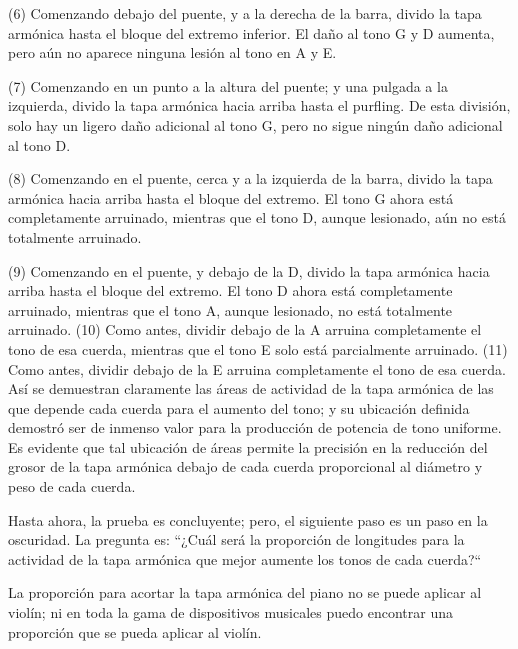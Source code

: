 \documentclass[12pt]{book}
\begin{document}
(6) Comenzando debajo del puente, y a la derecha de la barra, divido la tapa armónica hasta el bloque del extremo inferior. El daño al tono G y D aumenta, pero aún no aparece ninguna lesión al tono en A y E.

(7) Comenzando en un punto a la altura del puente; y una pulgada a la izquierda, divido la tapa armónica hacia arriba hasta el purfling. De esta división, solo hay un ligero daño adicional al tono G, pero no sigue ningún daño adicional al tono D.

(8) Comenzando en el puente, cerca y a la izquierda de la barra, divido la tapa armónica hacia arriba hasta el bloque del extremo. El tono G ahora está completamente arruinado, mientras que el tono D, aunque lesionado, aún no está totalmente arruinado.

(9) Comenzando en el puente, y debajo de la D, divido la tapa armónica hacia arriba hasta el bloque del extremo. El tono D ahora está completamente arruinado, mientras que el tono A, aunque lesionado, no está totalmente arruinado. (10) Como antes, dividir debajo de la A arruina completamente el tono de esa cuerda, mientras que el tono E solo está parcialmente arruinado. (11) Como antes, dividir debajo de la E arruina completamente el tono de esa cuerda. Así se demuestran claramente las áreas de actividad de la tapa armónica de las que depende cada cuerda para el aumento del tono; y su ubicación definida demostró ser de inmenso valor para la producción de potencia de tono uniforme. Es evidente que tal ubicación de áreas permite la precisión en la reducción del grosor de la tapa armónica debajo de cada cuerda proporcional al diámetro y peso de cada cuerda.

Hasta ahora, la prueba es concluyente; pero, el siguiente paso es un paso en la oscuridad. La pregunta es: ``¿Cuál será la proporción de longitudes para la actividad de la tapa armónica que mejor aumente los tonos de cada cuerda?``

La proporción para acortar la tapa armónica del piano no se puede aplicar al violín; ni en toda la gama de dispositivos musicales puedo encontrar una proporción que se pueda aplicar al violín.
\end{document}
